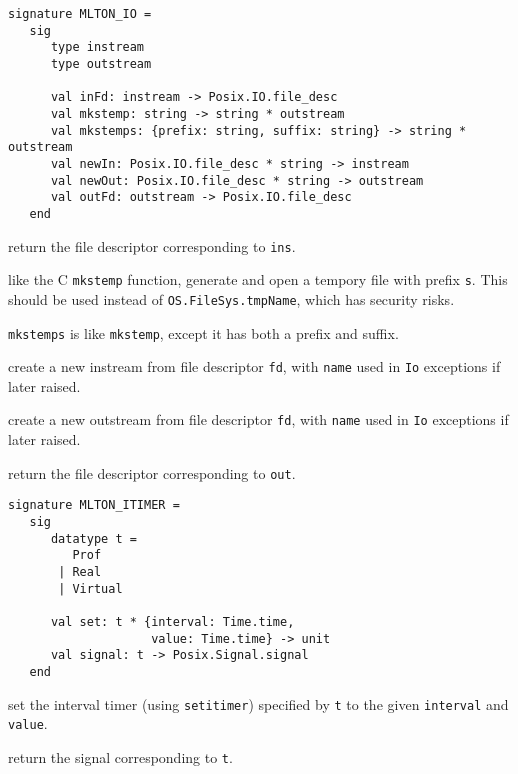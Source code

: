 
\begin{verbatim}
signature MLTON_IO =
   sig
      type instream
      type outstream

      val inFd: instream -> Posix.IO.file_desc
      val mkstemp: string -> string * outstream
      val mkstemps: {prefix: string, suffix: string} -> string * outstream
      val newIn: Posix.IO.file_desc * string -> instream
      val newOut: Posix.IO.file_desc * string -> outstream
      val outFd: outstream -> Posix.IO.file_desc
   end
\end{verbatim}

\begin{description}

 return the file descriptor corresponding to {\tt ins}.

like the C {\tt mkstemp} function, generate and open a tempory file with prefix
{\tt s}.  This should be used instead of {\tt OS.FileSys.tmpName}, which has
security risks.

{\tt mkstemps} is like {\tt mkstemp}, except it has both a prefix and suffix.

 create a new instream from file descriptor
{\tt fd}, with {\tt name} used in {\tt Io} exceptions if later
raised.

 create a new outstream from file descriptor
{\tt  fd}, with {\tt name} used in {\tt Io} exceptions if later
raised.

 return the file descriptor corresponding to
{\tt out}.
\end{description}


\begin{verbatim}
signature MLTON_ITIMER =
   sig
      datatype t =
         Prof
       | Real
       | Virtual

      val set: t * {interval: Time.time,
                    value: Time.time} -> unit
      val signal: t -> Posix.Signal.signal
   end
\end{verbatim}

\begin{description}
set the interval timer (using {\tt setitimer}) specified by {\tt t} to
the given {\tt interval} and {\tt value}.

return the signal corresponding to {\tt t}.
\end{description}
%
